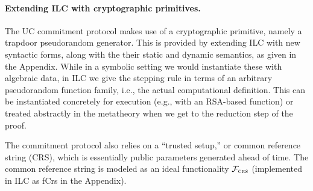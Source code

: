 
\paragraph{Extending ILC with cryptographic primitives.}
The UC commitment protocol makes use of a cryptographic primitive, namely a trapdoor pseudorandom generator. This is provided by extending ILC with new syntactic forms, along with the their static and dynamic semantics, as given in the Appendix.
While in a symbolic setting we would instantiate these with algebraic data, in ILC we give the stepping rule in terms of an arbitrary pseudorandom function family, i.e., the actual computational definition.
This can be instantiated concretely for execution (e.g., with an RSA-based function) or treated abstractly in the metatheory when we get to the reduction step of the proof.

The commitment protocol also relies on a
``trusted setup,'' or common reference string (CRS), which is essentially
public parameters generated ahead of time. The common reference string is
modeled as an ideal functionality $\mathcal{{F}}_{\textsc{crs}}$ (implemented
in ILC as \textsf{fCrs} in the Appendix).




